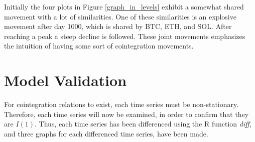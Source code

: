 \noindent Initially the four plots in Figure \ref{graph_in_levels} exhibit a somewhat shared movement with a lot of similarities. One of these similarities is an explosive movement after day 1000, which is shared by BTC, ETH, and SOL. After reaching a peak a steep decline is followed. These joint movements emphasizes the intuition of having some sort of cointegration movements.\\ 


\section{Model Validation}
For cointegration relations to exist, each time series must be non-stationary. Therefore, each time series will now be examined, in order to confirm that they are $I(1)$. Thus, each time series has been differenced using the R function \textit{diff}, and three graphs for each differenced time series, have been made.
